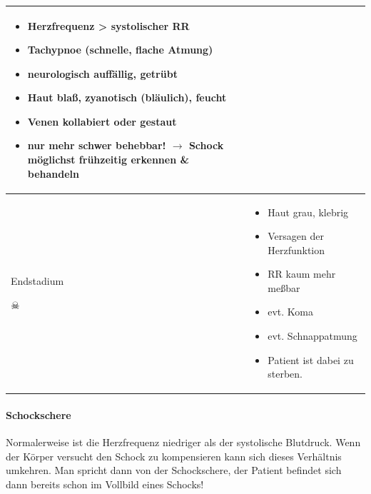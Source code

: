 \begin{center}
\begin{tabular}{|m{3.9750001cm}m{9.325cm}|}
\begin{itemize}
\end{itemize}
\begin{itemize}
\item Herzfrequenz {\textgreater} systolischer RR

\end{itemize}
\begin{itemize}
\item Tachypnoe (schnelle, flache Atmung)

\item neurologisch auff\"allig, getr\"ubt

\item Haut bla{\ss}, zyanotisch (bl\"aulich), feucht

\item Venen kollabiert oder gestaut

\item nur mehr schwer behebbar! ${\rightarrow}$ Schock  m\"oglichst
fr\"uhzeitig erkennen \&  behandeln

\end{itemize}
\\\hline
{\sffamily\Large\color{red}Endstadium}

\huge\centering $\skull$
 &
\begin{itemize}
\item Haut grau, klebrig

\item Versagen der Herzfunktion

\item RR kaum mehr me{\ss}bar

\item evt. Koma

\item evt. Schnappatmung

\item Patient ist dabei zu sterben.

\end{itemize}
\\\hline
\end{tabular}
\end{center}

\paragraph{Schockschere}

Normalerweise ist die Herzfrequenz niedriger als der systolische
Blutdruck. Wenn der K\"orper versucht den Schock zu kompensieren kann
sich dieses Verh\"altnis umkehren. Man spricht dann von der
Schockschere, der Patient befindet sich dann bereits schon im Vollbild
eines Schocks! 

